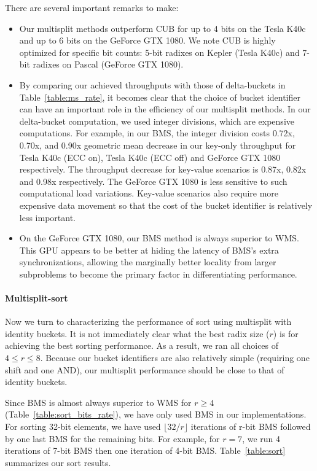 There are several important remarks to make:
\begin{itemize}
\item Our multisplit methods outperform CUB for up to 4 bits on the Tesla K40c and up to 6 bits on the GeForce GTX 1080. We note CUB is highly optimized for specific bit counts: 5-bit radixes on Kepler (Tesla K40c) and 7-bit radixes on Pascal (GeForce GTX 1080).
\item By comparing our achieved throughputs with those of delta-buckets in Table~\ref{table:ms_rate}, it becomes clear that the choice of bucket identifier can have an important role in the efficiency of our multisplit methods.
  In our delta-bucket computation, we used integer divisions, which are expensive computations.
  For example, in our BMS, the integer division costs 0.72x, 0.70x, and 0.90x geometric mean decrease in our key-only throughput for Tesla K40c (ECC on), Tesla K40c (ECC off) and GeForce GTX 1080 respectively. The throughput decrease for key-value scenarios is 0.87x, 0.82x and 0.98x respectively. The GeForce GTX 1080 is less sensitive to such computational load variations. Key-value scenarios also require more expensive data movement so that the cost of the bucket identifier is relatively less important.
\item On the GeForce GTX 1080, our BMS method is always superior to WMS. This GPU appears to be better at hiding the latency of BMS's extra synchronizations, allowing the marginally better locality from larger subproblems to become the primary factor in differentiating performance.
\end{itemize}

\paragraph{Multisplit-sort}
Now we turn to characterizing the performance of sort using multisplit with identity buckets.
It is not immediately clear what the best radix size ($r$) is for achieving the best sorting performance. As a result, we ran all choices of $4\leq r \leq 8$.
Because our bucket identifiers are also relatively simple (requiring one shift and one AND), our multisplit performance should be close to that of identity buckets.

Since BMS is almost always superior to WMS for $r\geq 4$ (Table~\ref{table:sort_bits_rate}), we have only used BMS in our implementations.
For sorting 32-bit elements, we have used $\lfloor 32/r \rfloor$ iterations of r-bit BMS followed by one last BMS for the remaining bits. For example, for $r = 7$, we run 4 iterations of 7-bit BMS then one iteration of 4-bit BMS\@.
Table~\ref{table:sort} summarizes our sort results.

